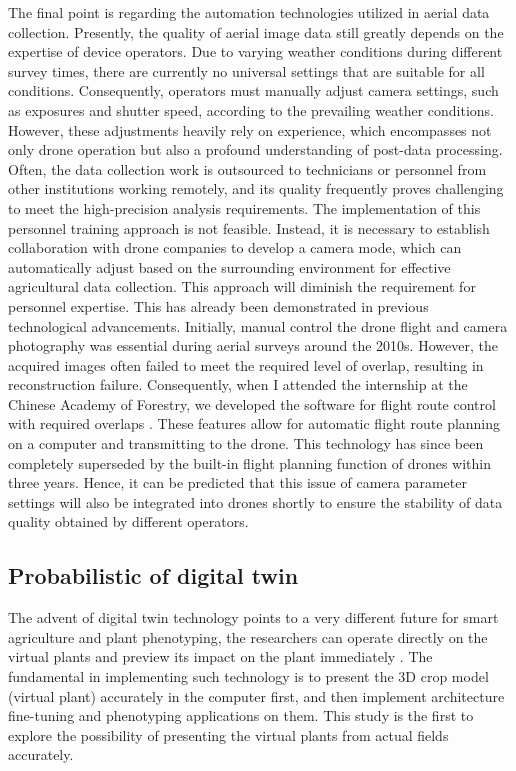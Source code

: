   The final point is regarding the automation technologies utilized in aerial data collection. 
  Presently, the quality of aerial image data still greatly depends on the expertise of device operators. 
  Due to varying weather conditions during different survey times, 
  there are currently no universal settings that are suitable for all conditions. 
  Consequently, operators must manually adjust camera settings, 
  such as exposures and shutter speed, according to the prevailing weather conditions. 
  However, these adjustments heavily rely on experience, 
  which encompasses not only drone operation but also a profound understanding of post-data processing. 
  Often, the data collection work is outsourced to technicians or personnel from other institutions working remotely, 
  and its quality frequently proves challenging to meet the high-precision analysis requirements.
  The implementation of this personnel training approach is not feasible. 
  Instead, it is necessary to establish collaboration with drone companies to develop a camera mode, 
  which can automatically adjust based on the surrounding environment for effective agricultural data collection. 
  This approach will diminish the requirement for personnel expertise. 
  This has already been demonstrated in previous technological advancements. 
  Initially, manual control the drone flight and camera photography was essential during aerial surveys around the 2010s. 
  However, the acquired images often failed to meet the required level of overlap, resulting in reconstruction failure. 
  Consequently, when I attended the internship at the Chinese Academy of Forestry, 
  we developed the software for flight route control with required overlaps \mbox{\citep[\url{www.uav-hirap.org}]{wang_uav-hirap_2017}}. 
  These features allow for automatic flight route planning on a computer and transmitting to the drone. 
  This technology has since been completely superseded by the built-in flight planning function of drones within three years. 
  Hence, it can be predicted that this issue of camera parameter settings will also be integrated into drones shortly to ensure the stability of data quality obtained by different operators.


\subsection{Probabilistic of digital twin}\label{sec:digitwin}


  The advent of digital twin technology points to a very different future for smart agriculture and plant phenotyping, 
  the researchers can operate directly on the virtual plants and preview its impact on the plant immediately \mbox{\citep{verdouw_digital_2021}}. 
  The fundamental in implementing such technology is to present the 3D crop model (virtual plant) accurately in the computer first, and then implement architecture fine-tuning and phenotyping applications on them.
  This study is the first to explore the possibility of presenting the virtual plants from actual fields accurately.


